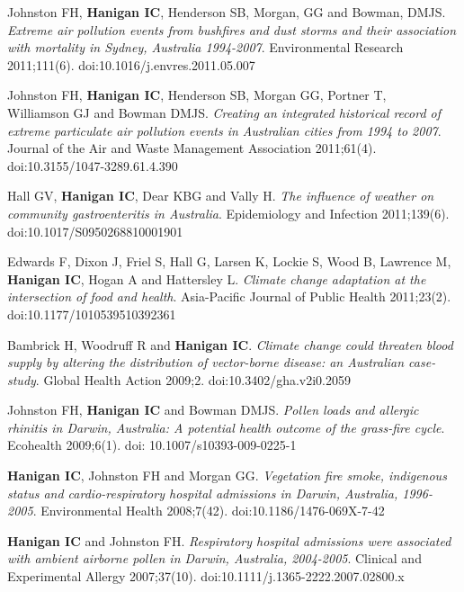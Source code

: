 \documentclass[a4paper,11pt]{article}
\begin{document}
\begin{revnumerate}
\item Johnston FH, \textbf{Hanigan IC}, Henderson SB, Morgan, GG and Bowman, DMJS. \emph{Extreme air pollution events from bushfires and dust storms and their association with mortality in Sydney, Australia 1994-2007}.  Environmental Research 2011;111(6). doi:10.1016/j.envres.2011.05.007

\item Johnston FH, \textbf{Hanigan IC}, Henderson SB, Morgan GG, Portner T, \\
 Williamson GJ and Bowman DMJS. \emph{Creating an integrated historical record of extreme particulate air pollution events in Australian cities from 1994 to 2007}. Journal of the Air and Waste Management Association 2011;61(4). doi:10.3155/1047-3289.61.4.390

\item Hall GV, \textbf{Hanigan IC}, Dear KBG and Vally H. \emph{The influence of weather on community gastroenteritis in Australia}. Epidemiology and Infection 2011;139(6). doi:10.1017/S0950268810001901

\item Edwards F, Dixon J, Friel S, Hall G, Larsen K, Lockie S, Wood B, Lawrence M, \textbf{Hanigan IC}, Hogan A and Hattersley L. \emph{Climate change adaptation at the intersection of food and health}. Asia-Pacific Journal of Public Health 2011;23(2). doi:10.1177/1010539510392361 

\item Bambrick H, Woodruff R and \textbf{Hanigan IC}. \emph{Climate change could threaten blood supply by altering the distribution of vector-borne disease: an Australian case-study}.  Global Health Action 2009;2. doi:10.3402/gha.v2i0.2059

\item Johnston FH, \textbf{Hanigan IC} and Bowman DMJS. \emph{Pollen loads and allergic rhinitis in Darwin, Australia: A potential health outcome of the grass-fire cycle}. Ecohealth 2009;6(1). doi: 10.1007/s10393-009-0225-1

\item \textbf{Hanigan IC}, Johnston FH and Morgan GG. \emph{Vegetation fire smoke, indigenous status and cardio-respiratory hospital admissions in Darwin, Australia, 1996-2005}. Environmental Health 2008;7(42). doi:10.1186/1476-069X-7-42

\item \textbf{Hanigan IC} and Johnston FH. \emph{Respiratory hospital admissions were associated with ambient airborne pollen in Darwin, Australia, 2004-2005}. Clinical and Experimental Allergy 2007;37(10). doi:10.1111/j.1365-2222.2007.02800.x


\end{revnumerate}
\end{document}
